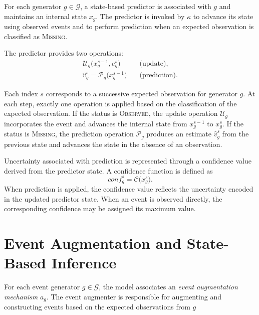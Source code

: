 For each generator $g \in \mathcal{G}$, a state-based predictor is associated with $g$ and maintains an internal state $x_g$. The predictor is invoked by $\kappa$ to advance its state using observed events and to perform prediction when an expected observation is classified as \textsc{Missing}.

The predictor provides two operations:
\begin{align}
\mathcal{U}_g\bigl(x_g^{s-1}, e_g^{s}\bigr)
&\quad\text{(update)}, \\
\hat{v}_g^{s} = \mathcal{P}_g\bigl(x_g^{s-1}\bigr)
&\quad\text{(prediction)}.
\end{align}

Each index $s$ corresponds to a successive expected observation for generator $g$. At each step, exactly one operation is applied based on the classification of the expected observation. If the status is \textsc{Observed}, the update operation $\mathcal{U}_g$ incorporates the event and advances the internal state from $x_g^{s-1}$ to $x_g^{s}$. If the status is \textsc{Missing}, the prediction operation $\mathcal{P}_g$ produces an estimate $\hat{v}_g^{s}$ from the previous state and advances the state in the absence of an observation. 

Uncertainty associated with prediction is represented through a confidence value derived from the predictor state. A confidence function is defined as
\begin{equation}
conf_g^{s} = \mathcal{C}\bigl(x_g^{s}\bigr).
\end{equation}
When prediction is applied, the confidence value reflects the uncertainty encoded in the updated predictor state. When an event is observed directly, the corresponding confidence may be assigned its maximum value.










\section{Event Augmentation and State-Based Inference}
\label{sec:event-augmentation-inference}

For each event generator $g \in \mathcal{G}$, the model associates an \emph{event augmentation mechanism} $a_g$. The event augmenter is responsible for augmenting and constructing events based on the expected observations from $g$

